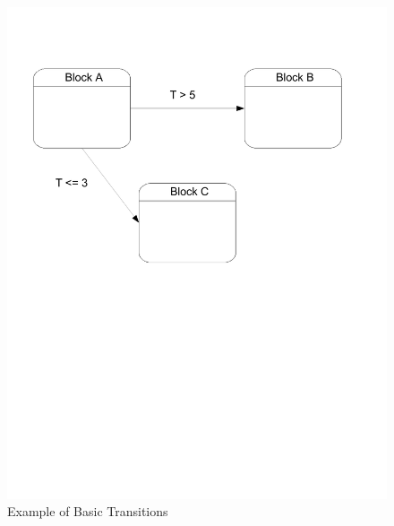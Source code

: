 
\begin{figure}[htp]
    \centering
    \includegraphics[trim= 10mm 130mm 20mm 10mm, clip, width=\imgmedphoto]{./images/state_transition.pdf}
    \caption{Example of Basic Transitions}
    \label{fig:state_transition_cor}
\end{figure}

